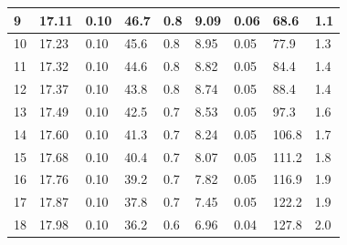 \documentclass[12pt, a4paper]{article}
\begin{document}
\begin{table}[H]
\begin{center}
\begin{tabular}{|l|llll|llll|}
	9  & \multicolumn{1}{l|}{17.11}  & \multicolumn{1}{l|}{0.10}     & \multicolumn{1}{l|}{46.7}    & 0.8       & \multicolumn{1}{l|}{9.09}   & \multicolumn{1}{l|}{0.06}     & \multicolumn{1}{l|}{68.6}    & 1.1       \\ \hline
	10 & \multicolumn{1}{l|}{17.23}  & \multicolumn{1}{l|}{0.10}     & \multicolumn{1}{l|}{45.6}    & 0.8       & \multicolumn{1}{l|}{8.95}   & \multicolumn{1}{l|}{0.05}     & \multicolumn{1}{l|}{77.9}    & 1.3       \\ \hline
	11 & \multicolumn{1}{l|}{17.32}  & \multicolumn{1}{l|}{0.10}     & \multicolumn{1}{l|}{44.6}    & 0.8       & \multicolumn{1}{l|}{8.82}   & \multicolumn{1}{l|}{0.05}     & \multicolumn{1}{l|}{84.4}    & 1.4       \\ \hline
	12 & \multicolumn{1}{l|}{17.37}  & \multicolumn{1}{l|}{0.10}     & \multicolumn{1}{l|}{43.8}    & 0.8       & \multicolumn{1}{l|}{8.74}   & \multicolumn{1}{l|}{0.05}     & \multicolumn{1}{l|}{88.4}    & 1.4       \\ \hline
	13 & \multicolumn{1}{l|}{17.49}  & \multicolumn{1}{l|}{0.10}     & \multicolumn{1}{l|}{42.5}    & 0.7       & \multicolumn{1}{l|}{8.53}   & \multicolumn{1}{l|}{0.05}     & \multicolumn{1}{l|}{97.3}    & 1.6       \\ \hline
	14 & \multicolumn{1}{l|}{17.60}  & \multicolumn{1}{l|}{0.10}     & \multicolumn{1}{l|}{41.3}    & 0.7       & \multicolumn{1}{l|}{8.24}   & \multicolumn{1}{l|}{0.05}     & \multicolumn{1}{l|}{106.8}   & 1.7       \\ \hline
	15 & \multicolumn{1}{l|}{17.68}  & \multicolumn{1}{l|}{0.10}     & \multicolumn{1}{l|}{40.4}    & 0.7       & \multicolumn{1}{l|}{8.07}   & \multicolumn{1}{l|}{0.05}     & \multicolumn{1}{l|}{111.2}   & 1.8       \\ \hline
	16 & \multicolumn{1}{l|}{17.76}  & \multicolumn{1}{l|}{0.10}     & \multicolumn{1}{l|}{39.2}    & 0.7       & \multicolumn{1}{l|}{7.82}   & \multicolumn{1}{l|}{0.05}     & \multicolumn{1}{l|}{116.9}   & 1.9       \\ \hline
	17 & \multicolumn{1}{l|}{17.87}  & \multicolumn{1}{l|}{0.10}     & \multicolumn{1}{l|}{37.8}    & 0.7       & \multicolumn{1}{l|}{7.45}   & \multicolumn{1}{l|}{0.05}     & \multicolumn{1}{l|}{122.2}   & 1.9       \\ \hline
	18 & \multicolumn{1}{l|}{17.98}  & \multicolumn{1}{l|}{0.10}     & \multicolumn{1}{l|}{36.2}    & 0.6       & \multicolumn{1}{l|}{6.96}   & \multicolumn{1}{l|}{0.04}     & \multicolumn{1}{l|}{127.8}   & 2.0       \\ \hline

\end{tabular}
\end{center}
\end{table}
\end{document}
